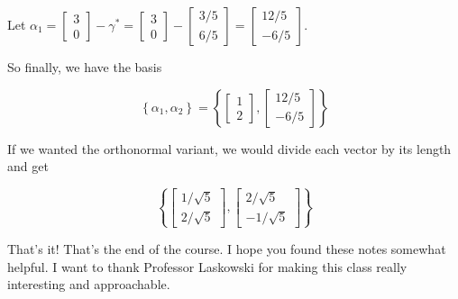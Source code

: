 \documentclass[12pt]{article}
\begin{document}
{      Let $\alpha_1 = \begin{bmatrix} 3 \\ 0 \end{bmatrix} - \gamma^* =
      \begin{bmatrix} 3 \\ 0 \end{bmatrix} - \begin{bmatrix} 3 / 5 \\ 6 / 5
    \end{bmatrix} = \begin{bmatrix} 12 / 5 \\ -6 / 5\end{bmatrix}$.

    So finally, we have the basis

    \[
      \left\{\alpha_1, \alpha_2 \right\} = \left\{ \begin{bmatrix} 1 \\ 2 \end{bmatrix}, \begin{bmatrix} 12 / 5 \\ -6 / 5 \end{bmatrix} \right\}
    \]

    If we wanted the orthonormal variant, we would divide each vector by its
    length and get

    \[
      \left\{ \begin{bmatrix} 1 / \sqrt{5} \\ 2 / \sqrt{5} \end{bmatrix}, \begin{bmatrix} 2 / \sqrt{5} \\ -1 / \sqrt{5} \end{bmatrix} \right\}
    \]
  }

  That's it! That's the end of the course. I hope you found these notes somewhat
  helpful. I want to thank Professor Laskowski for making this class really
  interesting and approachable.
\end{document}
